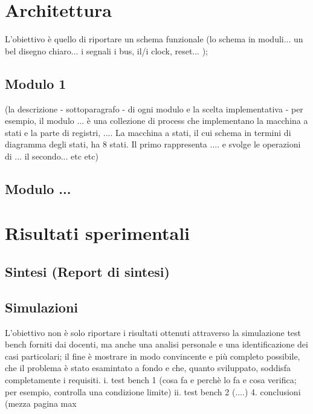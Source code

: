\documentclass[twoside]{hcmut-report}
\begin{document}
    \section{Architettura}
    L’obiettivo è quello di riportare un schema funzionale (lo schema in moduli... un bel disegno chiaro... i segnali i bus, il/i clock, reset... );
    \subsection{Modulo 1}
    (la descrizione - sottoparagrafo - di ogni modulo e la scelta
    implementativa - per esempio, il modulo ... è una collezione di process che
    implementano la macchina a stati e la parte di registri, .... La macchina a stati,
    il cui schema in termini di diagramma degli stati, ha 8 stati. Il primo
    rappresenta .... e svolge le operazioni di ... il secondo... etc etc)
    \subsection{Modulo ...}

    \section{Risultati sperimentali}

    \subsection{Sintesi (Report di sintesi)}
    \label{subsec:report}
    \subsection{Simulazioni}
    \label{subsec:sim}
    L'obiettivo non è solo riportare i risultati ottenuti attraverso la
    simulazione test bench forniti dai docenti, ma anche una analisi personale e
    una identificazione dei casi particolari; il fine è mostrare in modo convincente
    e più completo possibile, che il problema è stato esamintato a fondo e che,
    quanto sviluppato, soddisfa completamente i requisiti.
    i. test bench 1 (cosa fa e perchè lo fa e cosa verifica; per esempio,
    controlla una condizione limite)
    ii. test bench 2 (....)
    4. conclusioni (mezza pagina max




    
    
    

    
    
    \nocite{*}
\end{document}
